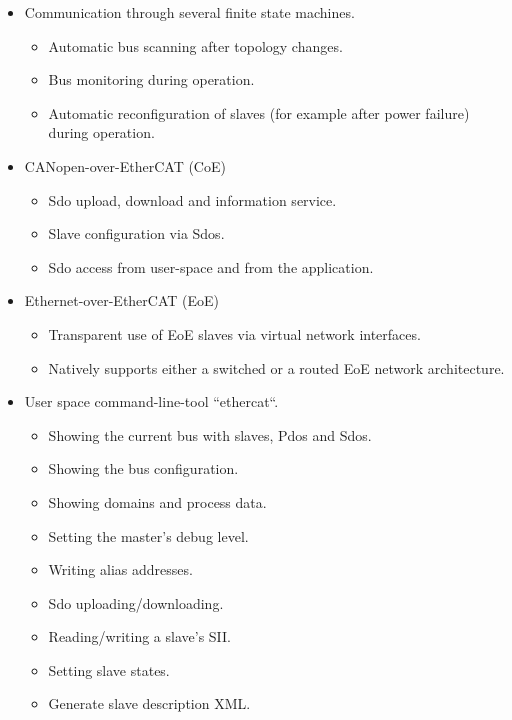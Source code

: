 \documentclass[a4paper,12pt,BCOR6mm,bibtotoc,idxtotoc]{scrbook}
\begin{document}
\begin{itemize}
\begin{itemize}
  \end{itemize}

\item Communication through several finite state machines.

  \begin{itemize}

  \item Automatic bus scanning after topology changes.

  \item Bus monitoring during operation.

  \item Automatic reconfiguration of slaves (for example after power failure)
  during operation.

  \end{itemize}

\item CANopen-over-EtherCAT (CoE)

  \begin{itemize}

  \item Sdo upload, download and information service.

  \item Slave configuration via Sdos.

  \item Sdo access from user-space and from the application.

  \end{itemize}

\item Ethernet-over-EtherCAT (EoE)

  \begin{itemize}

  \item Transparent use of EoE slaves via virtual network interfaces.

  \item Natively supports either a switched or a routed EoE network
  architecture.

  \end{itemize}

\item User space command-line-tool ``ethercat``.

  \begin{itemize}

  \item Showing the current bus with slaves, Pdos and Sdos.
  \item Showing the bus configuration.
  \item Showing domains and process data.
  \item Setting the master's debug level.
  \item Writing alias addresses.
  \item Sdo uploading/downloading.
  \item Reading/writing a slave's SII.
  \item Setting slave states.
  \item Generate slave description XML.


\end{itemize}
\end{itemize}
\end{document}
